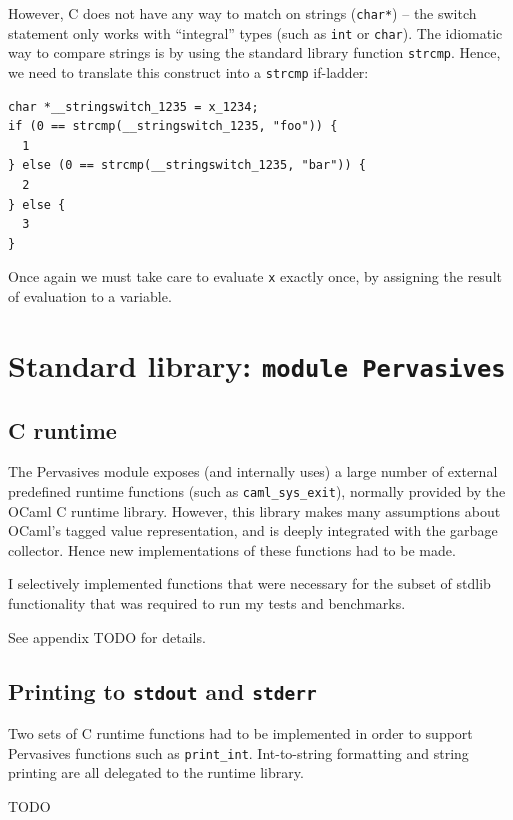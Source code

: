 \documentclass[12pt,a4paper,twoside,openright]{report}
\begin{document}
However, C does not have any way to match on strings (\lstinline!char*!) -- the
switch statement only works with ``integral'' types (such as \lstinline!int! or
\lstinline!char!). The idiomatic way to compare strings is by using the
standard library function \lstinline!strcmp!. Hence, we need to translate this
construct into a \lstinline!strcmp! if-ladder:
\begin{lstlisting}
char *__stringswitch_1235 = x_1234;
if (0 == strcmp(__stringswitch_1235, "foo")) {
  1
} else (0 == strcmp(__stringswitch_1235, "bar")) {
  2
} else {
  3
}\end{lstlisting}
Once again we must take care to evaluate \lstinline!x! exactly once, by
assigning the result of evaluation to a variable.

\section{Standard library: \texttt{module Pervasives}}\label{pervasives}

\subsection{C runtime}\label{pervasives-c-runtime}

The Pervasives module exposes (and internally uses) a large number of external
predefined runtime functions (such as \lstinline!caml_sys_exit!), normally
provided by the OCaml C runtime library. However, this library makes many
assumptions about OCaml's tagged value representation, and is deeply integrated
with the garbage collector. Hence new implementations of these functions had to
be made.

I selectively implemented functions that were necessary for the subset of
stdlib functionality that was required to run my tests and benchmarks.

See appendix TODO for details.

\subsection{Printing to \texttt{stdout} and \texttt{stderr}}\label{pervasives-printing}

Two sets of C runtime functions had to be implemented in order to support
Pervasives functions such as \lstinline!print_int!. Int-to-string formatting
and string printing are all delegated to the runtime library.

TODO
\end{document}
